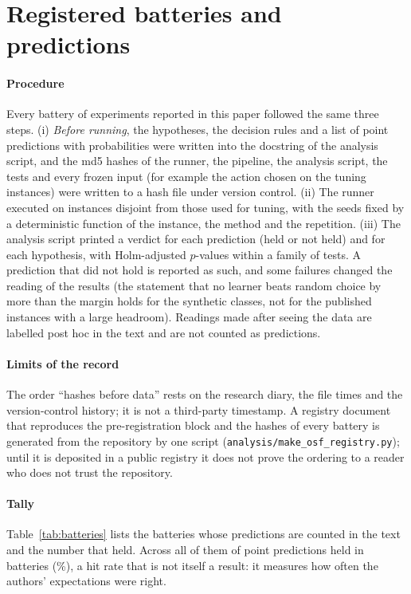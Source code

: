 \section{Registered batteries and predictions}
\label{app:batteries}
\paragraph{Procedure} Every battery of experiments reported in this paper followed the same three steps. (i) \emph{Before running}, the hypotheses, the decision rules and a list of point predictions with probabilities were written into the docstring of the analysis script, and the md5 hashes of the runner, the pipeline, the analysis script, the tests and every frozen input (for example the action chosen on the tuning instances) were written to a hash file under version control. (ii) The runner executed on instances disjoint from those used for tuning, with the seeds fixed by a deterministic function of the instance, the method and the repetition. (iii) The analysis script printed a verdict for each prediction (held or not held) and for each hypothesis, with Holm-adjusted $p$-values within a family of tests. A prediction that did not hold is reported as such, and some failures changed the reading of the results (the statement that no learner beats random choice by more than the margin holds for the synthetic classes, not for the published instances with a large headroom). Readings made after seeing the data are labelled post hoc in the text and are not counted as predictions.

\paragraph{Limits of the record} The order ``hashes before data'' rests on the research diary, the file times and the version-control history; it is not a third-party timestamp. A registry document that reproduces the pre-registration block and the hashes of every battery is generated from the repository by one script (\texttt{analysis/make\_osf\_registry.py}); until it is deposited in a public registry it does not prove the ordering to a reader who does not trust the repository. 

\paragraph{Tally} Table~\ref{tab:batteries} lists the batteries whose predictions are counted in the text and the number that held. Across all of them \npredheld{} of \npredtotal{} point predictions held in \nbatteries{} batteries (\npredshare\%), a hit rate that is not itself a result: it measures how often the authors' expectations were right.

